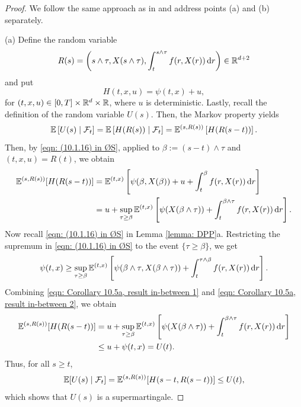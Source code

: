 \begin{proof}
    We follow the same approach as in {\cite[see Proof of Corollary 10.5]{oksendal2007applied}} and address points (a) and (b) separately. 
    
    (a) Define the random variable 
    \begin{equation*}
        R(s) = \left(s \wedge \tau, X(s \wedge \tau), \int_t^{s \wedge \tau} f(r,X(r)) \,\mathrm{d} r \right) \in \mathbb R^{d+2}
    \end{equation*}
    and put 
    \begin{equation*}
        H(t,x,u) = \psi(t,x) + u,
    \end{equation*}
    for $(t,x,u) \in [0,T] \times \mathbb{R}^d \times \mathbb{R}$, where $u$ is deterministic. Lastly, recall the definition of the random variable $U(s)$. Then, the Markov property yields
    \begin{equation*}
        \mathbb{E} \left[U(s) \mid \mathcal{F}_t \right] = \mathbb{E}\left[ H(R(s)) \mid \mathcal{F}_t \right] = \mathbb{E}^{(s,R(s))} \left[ H(R(s-t)) \right].
    \end{equation*}
    Then, by \eqref{eqn: (10.1.16) in ØS}, applied to $\beta:=(s-t)\wedge \tau$ and $(t,x,u) = R(t)$, we obtain
    \begin{align}
        \mathbb{E}^{(s,R(s))}[H(R(s-t))] &= \mathbb{E}^{(t,x)} \left[ \psi(\beta, X(\beta)) + u + \int_t^{\beta} f(r,X(r)) \,\mathrm{d} r \right] \nonumber \\
        & = u + \sup_{\tau \geq \beta} \mathbb{E}^{(t,x)}\left[ \psi(X(\beta \wedge\tau)) + \int_t^{\beta \wedge \tau} f(r,X(r)) \,\mathrm{d} r \right].
        \label{eqn: Corollary 10.5a, result in-between 1}
    \end{align}
    Now recall \eqref{eqn: (10.1.16) in ØS} in Lemma \ref{lemma: DPP}a. Restricting the supremum in \eqref{eqn: (10.1.16) in ØS} to the event $\{\tau \geq \beta\}$, we get 
    \begin{equation}
        \psi(t,x) \geq \sup_{\tau \geq \beta} \mathbb{E}^{(t,x)} \left[ \psi(\beta \wedge \tau, X(\beta \wedge \tau)) + \int_{t}^{\tau \wedge \beta} f(r,X(r)) \,\mathrm{d} r \right]. 
        \label{eqn: Corollary 10.5a, result in-between 2}
    \end{equation}
    Combining \eqref{eqn: Corollary 10.5a, result in-between 1} and \eqref{eqn: Corollary 10.5a, result in-between 2}, we obtain
    \begin{align*}
        \mathbb{E}^{(s,R(s))}[H(R(s-t))] &= u + \sup_{\tau \geq \beta} \mathbb{E}^{(t,x)}\left[ \psi(X(\beta \wedge\tau)) + \int_t^{\beta \wedge \tau} f(r,X(r)) \,\mathrm{d} r \right] \\
        & \leq u + \psi(t,x) = U(t).
    \end{align*}
    Thus, for all $s \geq t$,
    \begin{equation*}
        \mathbb{E}[U(s) \mid \mathcal{F}_t] = \mathbb{E}^{(s,R(s))}[H(s-t,R(s-t))] \leq U(t),
    \end{equation*}
    which shows that $U(s)$ is a supermartingale. 


\end{proof}
